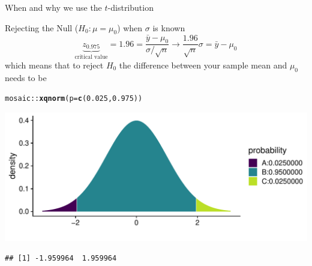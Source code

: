 \documentclass[10pt]{beamer}\usepackage[]{graphicx}\usepackage[]{color}
\makeatletter
\def\maxwidth{ %
  \ifdim\Gin@nat@width>\linewidth
    \linewidth
  \else
    \Gin@nat@width
  \fi
}
\newcommand{\hlnum}[1]{\textcolor[rgb]{0.686,0.059,0.569}{#1}}%
\newcommand{\hlopt}[1]{\textcolor[rgb]{0,0,0}{#1}}%
\newcommand{\hlstd}[1]{\textcolor[rgb]{0.345,0.345,0.345}{#1}}%
\newcommand{\hlkwc}[1]{\textcolor[rgb]{0.333,0.667,0.333}{#1}}%
\newcommand{\hlkwd}[1]{\textcolor[rgb]{0.737,0.353,0.396}{\textbf{#1}}}%
\newenvironment{kframe}{%
 \def\at@end@of@kframe{}%
 \ifinner\ifhmode%
  \def\at@end@of@kframe{\end{minipage}}%
  \begin{minipage}{\columnwidth}%
 \fi\fi%
 \def\FrameCommand##1{\hskip\@totalleftmargin \hskip-\fboxsep
 \colorbox{shadecolor}{##1}\hskip-\fboxsep
     \hskip-\linewidth \hskip-\@totalleftmargin \hskip\columnwidth}%
 \MakeFramed {\advance\hsize-\width
   \@totalleftmargin\z@ \linewidth\hsize
   \@setminipage}}%
 {\par\unskip\endMakeFramed%
 \at@end@of@kframe}
\newenvironment{knitrout}{}{} %
\makeatother
\begin{document}
\begin{frame}{When and why we use the $t$-distribution}
\end{frame}



\begin{frame}[fragile]{Rejecting the Null ($H_0: \mu = \mu_0$) when $\sigma$ is known}
	\small
	\[ \underbrace{z_{0.975}}_{\textrm{critical value}}=1.96 = \frac{\bar{y}-\mu_0}{\sigma/\sqrt{n}} \rightarrow \frac{1.96 }{\sqrt{n}}\sigma = \bar{y}-\mu_0   \] which means that to reject $H_0$ the difference between your sample mean and $\mu_0$ needs to be  

\begin{knitrout}\tiny
{}\color{fgcolor}\begin{kframe}
\begin{alltt}
\hlstd{mosaic}\hlopt{::}\hlkwd{xqnorm}\hlstd{(}\hlkwc{p} \hlstd{=} \hlkwd{c}\hlstd{(}\hlnum{0.025}\hlstd{,} \hlnum{0.975}\hlstd{))}
\end{alltt}
\end{kframe}

{\centering \includegraphics[width=\maxwidth]{figure/unnamed-chunk-12-1} 

}


\begin{kframe}\begin{verbatim}
## [1] -1.959964  1.959964
\end{verbatim}
\end{kframe}
\end{knitrout}
\end{frame}
\end{document}
